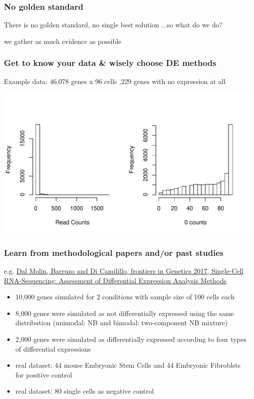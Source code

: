 \documentclass{beamer}\usepackage[]{graphicx}\usepackage[]{color}
\makeatletter
\def\maxwidth{ %
  \ifdim\Gin@nat@width>\linewidth
    \linewidth
  \else
    \Gin@nat@width
  \fi
}
\newenvironment{knitrout}{}{} %
\makeatother
\begin{document}
\begin{frame}
\frametitle{No golden standard}
There is no golden standard, no single best solution
\newline
\newline
...so what do we do?
\newline
\newline
\begin{flushright}
\pause we gather as much evidence as possible
\end{flushright}
\end{frame}

\begin{frame}
\frametitle{Get to know your data \& wisely choose DE methods}
Example data: 46,078 genes x 96 cells ,229 genes with no expression at all

\begin{knitrout}
\color{fgcolor}
\includegraphics[width=\maxwidth]{figure/knowdata-1} 

\end{knitrout}
\end{frame}

\begin{frame}
\frametitle{Learn from methodological papers and/or past studies}
e.g. \href{https://www.frontiersin.org/articles/10.3389/fgene.2017.00062/full(}{Dal Molin, Barruzo and Di Camilillo, frontiers in Genetics 2017, Single-Cell RNA-Sequencing: Assessment of Differential Expression Analysis Methods}
\begin{itemize}
\item 10,000 genes simulated for 2 conditions with sample size of 100 cells each
\item 8,000 genes were simulated as not differentially expressed using the same distribution (unimodal: NB and bimodal: two-component NB mixture)
\item 2,000 genes were simulated as differentially expressed according to four types of differential expressions 
\item real dataset: 44 mouse Embryonic Stem Cells and 44 Embryonic Fibroblsts for positive control
\item real dataset: 80 single cells as negative control
\end{itemize}
\end{frame}
\end{document}
